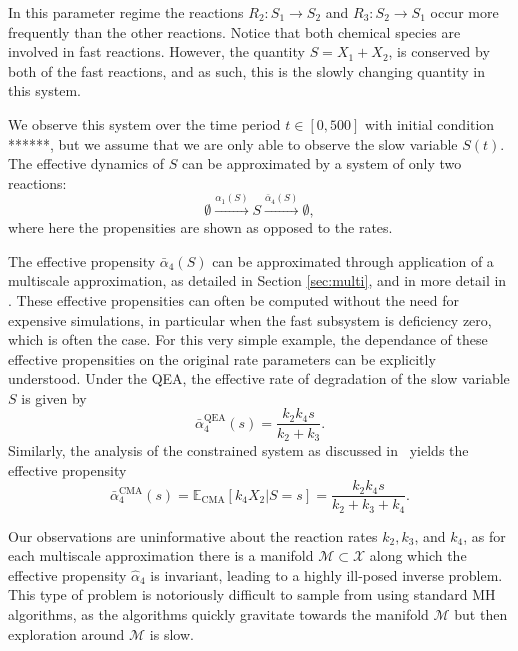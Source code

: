 \documentclass[final]{siamltex}
\begin{document}
 In this 
parameter regime the reactions $R_2\colon S_1\rightarrow S_2$ and $R_3\colon S_2\rightarrow S_1$ occur
more frequently than the other reactions. Notice that both
chemical species are involved in fast reactions. However, the quantity
$S = X_1 + X_2$, is conserved by both of the fast reactions,
and as such, this is the slowly changing quantity in this system.

We observe this system over the time period $t \in [0,500]$ with
initial condition ******, but we assume that we are only able to observe
the slow variable $S(t)$. 
The effective dynamics of $S$ can be approximated by a system of only
two reactions:
\begin{equation}\label{eqn:QSSA_system}
	\emptyset \xrightarrow{\alpha_1(S)} S \xrightarrow{\bar{\alpha}_4(S)} \emptyset,
\end{equation}
where here the propensities are shown as opposed to the rates.

The effective propensity $\bar{\alpha}_4(S)$ can be  approximated through
application of a multiscale approximation, as detailed in Section
\ref{sec:multi}, and in more detail in \cite{cotter2016constrained}. These effective
propensities can often be computed without the need for expensive
simulations, in particular when the fast subsystem is deficiency zero,
which is often the case\cite{anderson2010product,anderson2016product}. For this very
simple example, the dependance of these effective
propensities on the original rate parameters can be explicitly
understood. Under the QEA,
the effective rate of degradation of the slow variable $S$ is given by
\[
	\bar{\alpha}_4^{\text{QEA}}(s) = \frac{k_2k_4s}{k_2+k_3}.
\]
Similarly, the analysis of the constrained system as discussed in~\cite{cotter2016constrained} yields the effective propensity
\begin{equation}\label{eqn:chem_CMA_rate}
	\bar{\alpha}_4^{\text{CMA}}(s) = \mathbb{E}_{\text{CMA}}\left[k_4X_2|S=s\right] = \frac{k_2k_4s}{k_2+k_3+k_4}.
\end{equation}

Our observations are uninformative about the reaction rates $k_2,
k_3$, and $k_4$, as for each multiscale approximation there
is a manifold $\mathcal{M} \subset \mathcal{X}$ along which the effective propensity
$\hat{\alpha}_4$ is invariant, leading to a highly ill-posed inverse
problem. This type of problem is notoriously difficult to
sample from using standard MH algorithms, as the algorithms quickly
gravitate towards the manifold $\mathcal{M}$ but then
exploration around $\mathcal{M}$ is slow.
\end{document}
